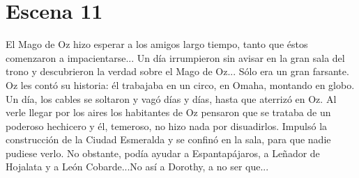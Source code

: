 \chapter{Escena 11}

El Mago de Oz hizo esperar a los amigos largo tiempo, tanto que éstos comenzaron a impacientarse...
Un día irrumpieron sin avisar en la gran sala del trono y descubrieron la verdad sobre el Mago de Oz... Sólo era un gran farsante.
Oz les contó su historia: él trabajaba en un circo, en Omaha, montando en globo. Un día, los cables se soltaron y vagó días y días, hasta que aterrizó en Oz. Al verle llegar por los aires los habitantes de Oz pensaron que se trataba de un poderoso hechicero y él, temeroso, no hizo nada por disuadirlos. Impulsó la construcción de la Ciudad Esmeralda y se confinó en la sala, para que nadie pudiese verlo.
No obstante, podía ayudar a Espantapájaros, a Leñador de Hojalata y a León Cobarde...No así a Dorothy, a no ser que...